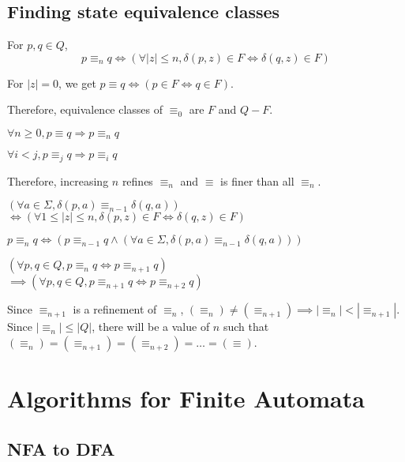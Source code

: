 \subsection{Finding state equivalence classes}

\begin{definition} For $p, q \in Q$,
\[ p \equiv_n q \iff (\forall |z| \le n, \delta(p, z) \in F \iff \delta(q, z) \in F) \]
\end{definition}
\begin{theorem}For $|z| = 0$, we get $p \equiv q \iff (p \in F \iff q \in F)$.\end{theorem}
Therefore, equivalence classes of $\equiv_0$ are $F$ and $Q-F$.
\begin{theorem}$\forall n \ge 0, p \equiv q \Rightarrow p \equiv_n q$\end{theorem}
\begin{theorem}$\forall i < j, p \equiv_j q \Rightarrow p \equiv_i q$\end{theorem}
Therefore, increasing $n$ refines $\equiv_n$ and $\equiv$ is finer than all $\equiv_n$.
\begin{theorem}$(\forall a \in \Sigma, \delta(p, a) \equiv_{n-1} \delta(q, a))$\\
$\iff (\forall 1 \le |z| \le n, \delta(p, z) \in F \iff \delta(q, z) \in F)$\end{theorem}
\begin{theorem}$p \equiv_n q \iff (p \equiv_{n-1} q \wedge
(\forall a \in \Sigma, \delta(p, a) \equiv_{n-1} \delta(q, a)))$ \end{theorem}
\begin{theorem}$(\forall p, q \in Q, p \equiv_n q \iff p \equiv_{n+1} q)$\\
$\implies (\forall p, q \in Q, p \equiv_{n+1} q \iff p \equiv_{n+2} q)$\end{theorem}

Since $\equiv_{n+1}$ is a refinement of $\equiv_n$,
$(\equiv_n) \neq (\equiv_{n+1}) \implies |\equiv_n| < |\equiv_{n+1}|$.
Since $|\equiv_n| \le |Q|$, there will be a value of $n$ such that
$(\equiv_n) = (\equiv_{n+1}) = (\equiv_{n+2}) = \ldots = (\equiv)$.

\section{Algorithms for Finite Automata}

\subsection{NFA to DFA}

